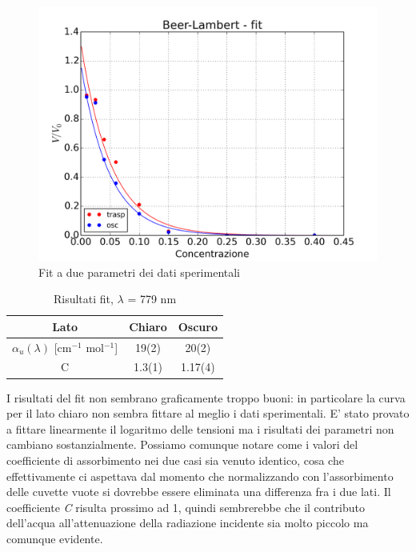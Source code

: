 \documentclass[10pt,letterpaper]{article}
\begin{document}
\begin{figure}[!h]
\centering
\includegraphics[scale=.6]{./concentr_es5}
\caption{Fit a due parametri dei dati sperimentali}
\label{fit:2}
\end{figure}

\begin{table}[!h]
\centering
\caption{Risultati fit, $\lambda$ = 779 nm}
\label{tab:fit}
\begin{tabular}{c|c|c}
\textbf{Lato} & \textbf{Chiaro} & \textbf{Oscuro} \\
\hline
$\alpha _u (\lambda)$ [cm$^{-1}$ mol$^{-1}$]& 19(2) & 20(2) \\ 
\hline 
C & 1.3(1) & 1.17(4) \\ 
\end{tabular} 
\end{table}

I risultati del fit non sembrano graficamente troppo buoni: in particolare la curva per il lato chiaro non sembra fittare al meglio i dati sperimentali. E' stato provato a fittare linearmente il logaritmo delle tensioni ma i risultati dei parametri non cambiano sostanzialmente. Possiamo comunque notare come i valori del coefficiente di assorbimento nei due casi sia venuto identico, cosa che effettivamente ci aspettava dal momento che normalizzando con l'assorbimento delle cuvette vuote si dovrebbe essere eliminata una differenza fra i due lati. Il coefficiente \emph{C} risulta prossimo ad 1, quindi sembrerebbe che il contributo dell'acqua all'attenuazione della radiazione incidente sia molto piccolo ma comunque evidente.\\
\end{document}
